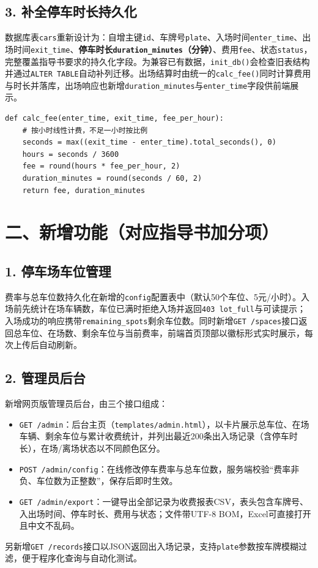 \documentclass[12pt,a4paper]{article}
\begin{document}
\subsection*{3. 补全停车时长持久化}
数据库表\texttt{cars}重新设计为：自增主键\texttt{id}、车牌号\texttt{plate}、入场时间\texttt{enter\_time}、出场时间\texttt{exit\_time}、\textbf{停车时长\texttt{duration\_minutes}（分钟）}、费用\texttt{fee}、状态\texttt{status}，完整覆盖指导书要求的持久化字段。为兼容已有数据，\texttt{init\_db()}会检查旧表结构并通过\texttt{ALTER TABLE}自动补列迁移。出场结算时由统一的\texttt{calc\_fee()}同时计算费用与时长并落库，出场响应也新增\texttt{duration\_minutes}与\texttt{enter\_time}字段供前端展示。

\begin{lstlisting}
def calc_fee(enter_time, exit_time, fee_per_hour):
    # 按小时线性计费，不足一小时按比例
    seconds = max((exit_time - enter_time).total_seconds(), 0)
    hours = seconds / 3600
    fee = round(hours * fee_per_hour, 2)
    duration_minutes = round(seconds / 60, 2)
    return fee, duration_minutes
\end{lstlisting}

\section*{二、新增功能（对应指导书加分项）}

\subsection*{1. 停车场车位管理}
费率与总车位数持久化在新增的\texttt{config}配置表中（默认50个车位、5元/小时）。入场前先统计在场车辆数，车位已满时拒绝入场并返回\texttt{403 lot\_full}与可读提示；入场成功的响应携带\texttt{remaining\_spots}剩余车位数。同时新增\texttt{GET /spaces}接口返回总车位、在场数、剩余车位与当前费率，前端首页顶部以徽标形式实时展示，每次上传后自动刷新。

\subsection*{2. 管理员后台}
新增网页版管理员后台，由三个接口组成：
\begin{itemize}
  \item \texttt{GET /admin}：后台主页（\texttt{templates/admin.html}），以卡片展示总车位、在场车辆、剩余车位与累计收费统计，并列出最近200条出入场记录（含停车时长），在场/离场状态以不同颜色区分。
  \item \texttt{POST /admin/config}：在线修改停车费率与总车位数，服务端校验“费率非负、车位数为正整数”，保存后即时生效。
  \item \texttt{GET /admin/export}：一键导出全部记录为收费报表CSV，表头包含车牌号、入出场时间、停车时长、费用与状态；文件带UTF-8 BOM，Excel可直接打开且中文不乱码。
\end{itemize}
另新增\texttt{GET /records}接口以JSON返回出入场记录，支持\texttt{plate}参数按车牌模糊过滤，便于程序化查询与自动化测试。
\end{document}
